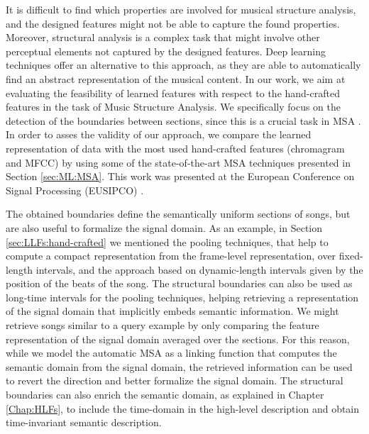 It is difficult to find which properties are involved for musical structure analysis, and the designed features might not be able to capture the found properties. Moreover, structural analysis is a complex task that might involve other perceptual elements not captured by the designed features. Deep learning techniques offer an alternative to this approach, as they are able to automatically find an abstract representation of the musical content. In our work, we aim at evaluating the feasibility of learned features with respect to the hand-crafted features in the task of Music Structure Analysis. We specifically focus on the detection of the boundaries between sections, since this is a crucial task in MSA \cite{Nieto2D}. In order to asses the validity of our approach, we compare the learned representation of data with the most used hand-crafted features (chromagram and MFCC) by using some of the state-of-the-art MSA techniques presented in Section \ref{sec:ML:MSA}. This work was presented at the European Conference on Signal Processing (EUSIPCO) \cite{Buccoli2016MSA}.

The obtained boundaries define the semantically uniform sections of songs, but are also useful to formalize the signal domain. As an example, in Section \ref{sec:LLFs:hand-crafted} we mentioned the pooling techniques, that help to compute a compact representation from the frame-level representation, over fixed-length intervals, and the approach based on dynamic-length intervals given by the position of the beats of the song. The structural boundaries can also be used as long-time intervals for the pooling techniques, helping retrieving a representation of the signal domain that implicitly embeds semantic information. We might retrieve songs similar to a query example by only comparing the feature representation of the signal domain averaged over the sections. For this reason, while we model the automatic MSA as a linking function that computes the semantic domain from the signal domain, the retrieved information can be used to revert the direction and better formalize the signal domain. The structural boundaries can also enrich the semantic domain, as explained in Chapter \ref{Chap:HLFs}, to include the time-domain in the high-level description and obtain time-invariant semantic description.


